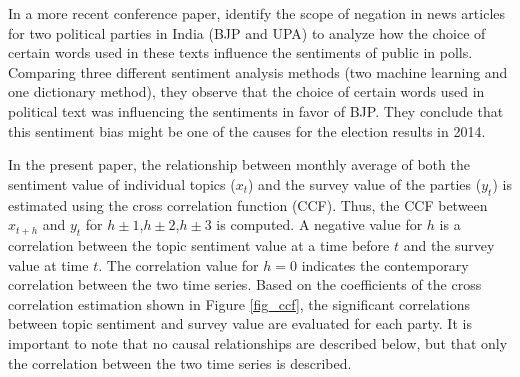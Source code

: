\documentclass[12pt,a4paper,notitlepage]{article}
\begin{document}
In a more recent conference paper, \citet{padmaja_evaluating_2014} identify the scope of negation in news articles for two political parties in India (BJP and UPA) to analyze how the choice of certain words used in these texts influence the sentiments of public in polls. Comparing three different sentiment analysis methods (two machine learning and one dictionary method), they observe that the choice of certain words used in political text was influencing the sentiments in favor of BJP. They conclude that this sentiment bias might be one of the causes for the election results in 2014.

In the present paper, the relationship between monthly average of both the sentiment value of individual topics ($x_t$) and the survey value of the parties ($y_t$) is estimated using the cross correlation function (CCF). Thus, the CCF between $x_{t+h}$ and $y_t$ for $h\pm 1$,$h \pm 2$,$h \pm 3$ is computed. A negative value for $h$ is a correlation between the topic sentiment value at a time before $t$ and the survey value at time $t$. The correlation value for $h=0$ indicates the contemporary correlation between the two time series.  Based on the coefficients of the cross correlation estimation shown in Figure \ref{fig_ccf}, the significant correlations between topic sentiment and survey value are evaluated for each party. It is important to note that no causal relationships are described below, but that only the correlation between the two time series is described. 
\end{document}

